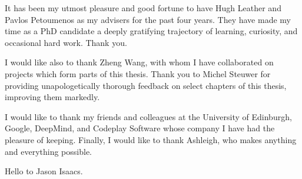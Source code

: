 It has been my utmost pleasure and good fortune to have Hugh Leather and Pavlos Petoumenos as my advisers for the past four years. They have made my time as a PhD candidate a deeply gratifying trajectory of learning, curiosity, and occasional hard work. Thank you.

I would like also to thank Zheng Wang, with whom I have collaborated on projects which form parts of this thesis. Thank you to Michel Steuwer for providing unapologetically thorough feedback on select chapters of this thesis, improving them markedly.

I would like to thank my friends and colleagues at the University of Edinburgh, Google, DeepMind, and Codeplay Software whose company I have had the pleasure of keeping. Finally, I would like to thank Ashleigh, who makes anything and everything possible.

Hello to Jason Isaacs.